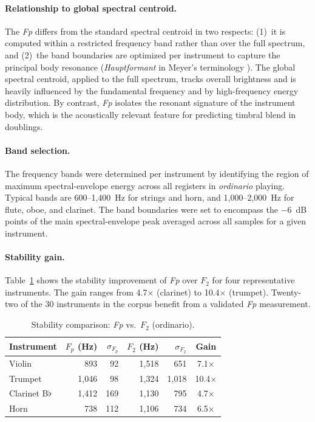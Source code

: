 \documentclass[12pt,a4paper]{article}
\begin{document}
\paragraph{Relationship to global spectral centroid.}
The \textit{Fp} differs from the standard spectral centroid \citep{Peeters2011}
in two respects: (1)~it is computed within a restricted frequency band rather
than over the full spectrum, and (2)~the band boundaries are optimized per
instrument to capture the principal body resonance (\emph{Hauptformant} in
Meyer's terminology \citep{Meyer2009}). The global spectral centroid, applied to
the full spectrum, tracks overall brightness and is heavily influenced by the
fundamental frequency and by high-frequency energy distribution. By contrast,
\textit{Fp} isolates the resonant signature of the instrument body, which is the
acoustically relevant feature for predicting timbral blend in doublings.

\paragraph{Band selection.}
The frequency bands were determined per instrument by identifying the region of
maximum spectral-envelope energy across all registers in \emph{ordinario}
playing. Typical bands are 600--1,400~Hz for strings and horn, and
1,000--2,000~Hz for flute, oboe, and clarinet. The band boundaries were set to
encompass the $-6$~dB points of the main spectral-envelope peak averaged across
all samples for a given instrument.

\paragraph{Stability gain.}
Table~\ref{tab:fp_stability} shows the stability improvement of \textit{Fp}
over $F_2$ for four representative instruments. The gain ranges from
4.7$\times$ (clarinet) to 10.4$\times$ (trumpet). Twenty-two of the
30 instruments in the corpus benefit from a validated \textit{Fp} measurement.

\begin{table}[htbp]
\centering
\caption{Stability comparison: \textit{Fp} vs.\ $F_2$ (ordinario).}
\label{tab:fp_stability}
\begin{tabular}{lrrrrc}
\toprule
Instrument & $F_p$ (Hz) & $\sigma_{F_p}$ & $F_2$ (Hz) & $\sigma_{F_2}$ & Gain \\
\midrule
Violin     & 893  & 92  & 1,518 & 651   & 7.1$\times$ \\
Trumpet    & 1,046 & 98  & 1,324 & 1,018 & 10.4$\times$ \\
Clarinet B$\flat$ & 1,412 & 169 & 1,130 & 795 & 4.7$\times$ \\
Horn       & 738  & 112 & 1,106 & 734   & 6.5$\times$ \\
\bottomrule
\end{tabular}
\end{table}
\end{document}
